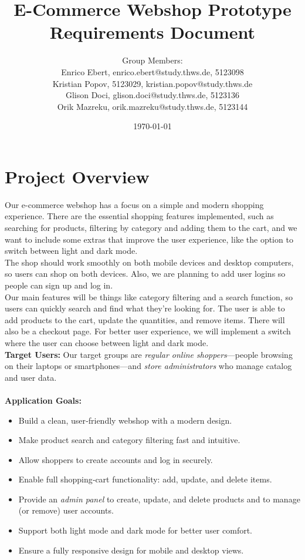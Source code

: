 \documentclass[a4paper,12pt]{article}
\title{E-Commerce Webshop Prototype \\
	Requirements Document}
\author{
	Group Members: \\
	Enrico Ebert, enrico.ebert@study.thws.de, 5123098 \\
	Kristian Popov, 5123029, kristian.popov@study.thws.de \\
	Glison Doci, glison.doci@study.thws.de, 5123136 \\
	Orik Mazreku, orik.mazreku@study.thws.de, 5123144
}
\date{\today}
\begin{document}
	
	\maketitle
	
\section{Project Overview}

Our e-commerce webshop has a focus on a simple and modern shopping experience. There are the essential shopping features implemented, such as searching for products, filtering by category and adding them to the cart, and we want to include some extras that improve the user experience, like the option to switch between light and dark mode. \\

The shop should work smoothly on both mobile devices and desktop computers, so users can shop on both devices. Also, we are planning to add user logins so people can sign up and log in.\\

Our main features will be things like category filtering and a search function, so users can quickly search and find what they’re looking for. The user is able to add products to the cart, update the quantities, and remove items. There will also be a checkout page. For better user experience, we will implement a switch where the user can choose between light and dark mode.\\

\textbf{Target Users:}
Our target groups are \emph{regular online shoppers}—people browsing on their laptops or smartphones—and \emph{store administrators} who manage catalog and user data.\\\\

\textbf{Application Goals:}
\begin{itemize}
	\item Build a clean, user‑friendly webshop with a modern design.
	\item Make product search and category filtering fast and intuitive.
	\item Allow shoppers to create accounts and log in securely.
	\item Enable full shopping‑cart functionality: add, update, and delete items.
	\item Provide an \emph{admin panel} to create, update, and delete products and to manage (or remove) user accounts.
	\item Support both light mode and dark mode for better user comfort.
	\item Ensure a fully responsive design for mobile and desktop views.

\end{itemize}
	
\end{document}
